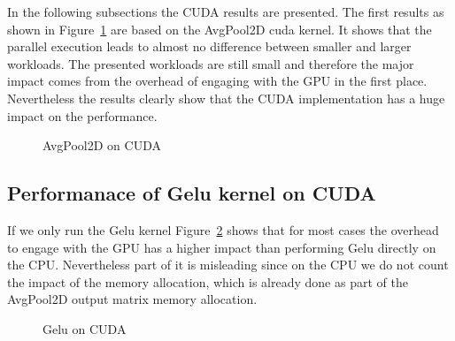 \documentclass[letterpaper]{article}
\begin{document}
In the following subsections the CUDA results are presented. The first results as shown in Figure~\ref{cudaAvgPool} are based on the AvgPool2D cuda kernel. It shows that the parallel execution leads to almost no difference between smaller and larger workloads. The presented workloads are still small and therefore the major impact comes from the overhead of engaging with the GPU in the first place. Nevertheless the results clearly show that the CUDA implementation has a huge impact on the performance. 

\begin{figure}

\caption{AvgPool2D on CUDA}
\label{cudaAvgPool}
\end{figure}

\subsection{Performanace of Gelu kernel on CUDA}

If we only run the Gelu kernel Figure~\ref{cudaGelu} shows that for most cases the overhead to engage with the GPU has a higher impact than performing Gelu directly on the CPU. Nevertheless part of it is misleading since on the CPU we do not count the impact of the memory allocation, which is already done as part of the AvgPool2D output matrix memory allocation. 

\begin{figure}
\caption{Gelu on CUDA}
\label{cudaGelu}
\end{figure}
\end{document}
